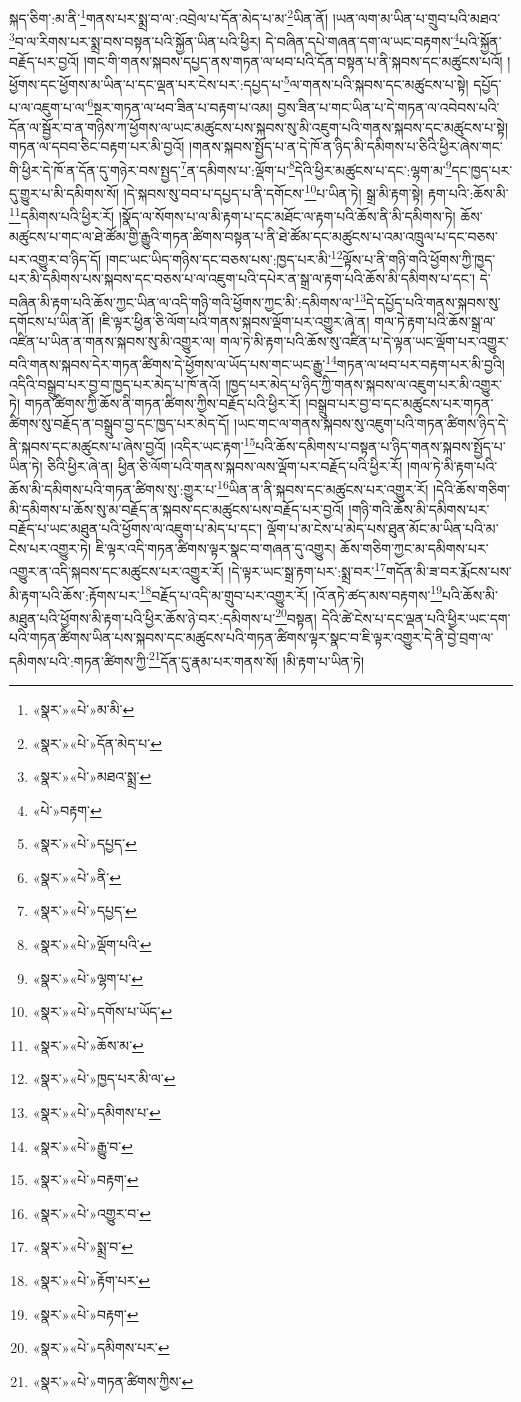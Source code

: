 སྐད་ཅིག་:མ་ནི་\footnote{«སྣར་»«པེ་»མ་མི་}གནས་པར་སྨྲ་བ་ལ་:འབྲེལ་པ་དོན་མེད་པ་མ་\footnote{«སྣར་»«པེ་»དོན་མེད་པ་}ཡིན་ནོ། །ཡན་ལག་མ་ཡིན་པ་གྲུབ་པའི་མཐའ་\footnote{«སྣར་»«པེ་»མཐའ་སྨྲ་}བ་ལ་རིགས་པར་སྨྲ་བས་བསྟན་པའི་སྐྱོན་ཡིན་པའི་ཕྱིར། དེ་བཞིན་དཔེ་གཞན་དག་ལ་ཡང་བརྟགས་\footnote{«པེ་»བརྟག་}པའི་སྐྱོན་བརྗོད་པར་བྱའོ། །གང་གི་གནས་སྐབས་དཔྱད་ནས་གཏན་ལ་ཕབ་པའི་དོན་བསྟན་པ་ནི་སྐབས་དང་མཚུངས་པའོ། །ཕྱོགས་དང་ཕྱོགས་མ་ཡིན་པ་དང་ལྡན་པར་ངེས་པར་:དཔྱད་པ་\footnote{«སྣར་»«པེ་»དཔྱད་}ལ་གནས་པའི་སྐབས་དང་མཚུངས་པ་སྟེ། དཔྱོད་པ་ལ་འཇུག་པ་ལ་\footnote{«སྣར་»«པེ་»ནི་}སྔར་གཏན་ལ་ཕབ་ཟིན་པ་བརྟག་པ་འམ། བྱས་ཟིན་པ་གང་ཡིན་པ་དེ་གཏན་ལ་འབེབས་པའི་དོན་ལ་སྦྱོར་བ་ན་གཉིས་ཀ་ཕྱོགས་ལ་ཡང་མཚུངས་པས་སྐབས་སུ་མི་འཇུག་པའི་གནས་སྐབས་དང་མཚུངས་པ་སྟེ། གཏན་ལ་དབབ་ཅིང་བརྟག་པར་མི་བྱའོ། །གནས་སྐབས་སྤྱོད་པ་ན་དེ་ཁོ་ན་ཉིད་མི་དམིགས་པ་ཅིའི་ཕྱིར་ཞེས་གང་གི་ཕྱིར་དེ་ཁོ་ན་དོན་དུ་གཉེར་བས་སྤྱད་\footnote{«སྣར་»«པེ་»དཔྱད་}ན་དམིགས་པ་:ལྡོག་པ་\footnote{«སྣར་»«པེ་»ལྡོག་པའི་}དེའི་ཕྱིར་མཚུངས་པ་དང་:ལྷག་མ་\footnote{«སྣར་»«པེ་»ལྷག་པ་}དང་ཁྱད་པར་དུ་གྱུར་པ་མི་དམིགས་སོ། །དེ་སྐབས་སུ་བབ་པ་དཔྱད་པ་ནི་དགོངས་\footnote{«སྣར་»«པེ་»དགོས་པ་ཡོད་}པ་ཡིན་ཏེ། སྒྲ་མི་རྟག་སྟེ། རྟག་པའི་:ཆོས་མི་\footnote{«སྣར་»«པེ་»ཆོས་མ་}དམིགས་པའི་ཕྱིར་རོ། །སྣོད་ལ་སོགས་པ་ལ་མི་རྟག་པ་དང་མཐོང་ལ་རྟག་པའི་ཆོས་ནི་མི་དམིགས་ཏེ། ཆོས་མཚུངས་པ་གང་ལ་ཐེ་ཚོམ་གྱི་རྒྱུའི་གཏན་ཚིགས་བསྟན་པ་ནི་ཐེ་ཚོམ་དང་མཚུངས་པ་འམ་འཁྲུལ་པ་དང་བཅས་པར་འགྱུར་བ་ཉིད་དོ། །གང་ཡང་ཡིད་གཉིས་དང་བཅས་པས་:ཁྱད་པར་མི་\footnote{«སྣར་»«པེ་»ཁྱད་པར་མི་ལ་}ལྟོས་པ་ནི་གཉི་གའི་ཕྱོགས་ཀྱི་ཁྱད་པར་མི་དམིགས་པས་སྐབས་དང་བཅས་པ་ལ་འཇུག་པའི་དཔེར་ན་སྒྲ་ལ་རྟག་པའི་ཆོས་མི་དམིགས་པ་དང་། དེ་བཞིན་མི་རྟག་པའི་ཆོས་ཀྱང་ཡིན་ལ་འདི་གཉི་གའི་ཕྱོགས་ཀྱང་མི་:དམིགས་ལ་\footnote{«སྣར་»«པེ་»དམིགས་པ་}དེ་དཔྱོད་པའི་གནས་སྐབས་སུ་དགོངས་པ་ཡིན་ནོ། །ཇི་ལྟར་ཕྱིན་ཅི་ལོག་པའི་གནས་སྐབས་ལྡོག་པར་འགྱུར་ཞེ་ན། གལ་ཏེ་རྟག་པའི་ཆོས་སྒྲ་ལ་འཛིན་པ་ཡིན་ན་གནས་སྐབས་སུ་མི་འགྱུར་ལ། གལ་ཏེ་མི་རྟག་པའི་ཆོས་སུ་འཛིན་པ་དེ་ལྟན་ཡང་ལྡོག་པར་འགྱུར་བའི་གནས་སྐབས་དེར་གཏན་ཚིགས་དེ་ཕྱོགས་ལ་ཡོད་པས་གང་ཡང་རྒྱུ་\footnote{«སྣར་»«པེ་»རྒྱུ་བ་}གཏན་ལ་ཕབ་པར་བརྟག་པར་མི་བྱའི། འདིའི་བསྒྲུབ་པར་བྱ་བ་ཁྱད་པར་མེད་པ་ཁོ་ནའོ། །ཁྱད་པར་མེད་པ་ཉིད་ཀྱི་གནས་སྐབས་ལ་འཇུག་པར་མི་འགྱུར་ཏེ། གཏན་ཚིགས་ཀྱི་ཆོས་ནི་གཏན་ཚིགས་ཀྱིས་བརྗོད་པའི་ཕྱིར་རོ། །བསྒྲུབ་པར་བྱ་བ་དང་མཚུངས་པར་གཏན་ཚིགས་སུ་བརྗོད་ན་བསྒྲུབ་བྱ་དང་ཁྱད་པར་མེད་དོ། །ཡང་གང་ལ་གནས་སྐབས་སུ་འཇུག་པའི་གཏན་ཚིགས་ཉིད་དེ་ནི་སྐབས་དང་མཚུངས་པ་ཞེས་བྱའོ། །འདིར་ཡང་རྟག་\footnote{«སྣར་»«པེ་»བརྟག་}པའི་ཆོས་དམིགས་པ་བསྟན་པ་ཉིད་གནས་སྐབས་སྤྱོད་པ་ཡིན་ཏེ། ཅིའི་ཕྱིར་ཞེ་ན། ཕྱིན་ཅི་ལོག་པའི་གནས་སྐབས་ལས་ལྡོག་པར་བརྗོད་པའི་ཕྱིར་རོ། །གལ་ཏེ་མི་རྟག་པའི་ཆོས་མི་དམིགས་པའི་གཏན་ཚིགས་སུ་:གྱུར་པ་\footnote{«སྣར་»«པེ་»འགྱུར་བ་}ཡིན་ན་ནི་སྐབས་དང་མཚུངས་པར་འགྱུར་རོ། །དེའི་ཆོས་གཅིག་མི་དམིགས་པ་ཆོས་སུ་མ་བརྗོད་ན་སྐབས་དང་མཚུངས་པས་བརྗོད་པར་བྱའོ། །གཉི་གའི་ཆོས་མི་དམིགས་པར་བརྗོད་པ་ཡང་མཐུན་པའི་ཕྱོགས་ལ་འཇུག་པ་མེད་པ་དང་། ལྡོག་པ་མ་ངེས་པ་མེད་པས་ཐུན་མོང་མ་ཡིན་པའི་མ་ངེས་པར་འགྱུར་ཏེ། ཇི་ལྟར་འདི་གཏན་ཚིགས་ལྟར་སྣང་བ་གཞན་དུ་འགྱུར། ཆོས་གཅིག་ཀྱང་མ་དམིགས་པར་འགྱུར་ན་འདི་སྐབས་དང་མཚུངས་པར་འགྱུར་རོ། །དེ་ལྟར་ཡང་སྒྲ་རྟག་པར་:སྨྲ་བར་\footnote{«སྣར་»«པེ་»སྨྲ་བ་}གདོན་མི་ཟ་བར་རྨོངས་པས་མི་རྟག་པའི་ཆོས་:རྟོགས་པར་\footnote{«སྣར་»«པེ་»རྟོག་པར་}བརྗོད་པ་འདི་མ་གྲུབ་པར་འགྱུར་རོ། །འོ་ནཏེ་ཚད་མས་བརྟགས་\footnote{«སྣར་»«པེ་»བརྟག་}པའི་ཆོས་མི་མཐུན་པའི་ཕྱོགས་མི་རྟག་པའི་ཕྱིར་ཆོས་ཉེ་བར་:དམིགས་པ་\footnote{«སྣར་»«པེ་»དམིགས་པར་}བསྟན། དེའི་ཚེ་ངེས་པ་དང་ལྡན་པའི་ཕྱིར་ཡང་དག་པའི་གཏན་ཚིགས་ཡིན་པས་སྐབས་དང་མཚུངས་པའི་གཏན་ཚིགས་ལྟར་སྣང་བ་ཇི་ལྟར་འགྱུར་དེ་ནི་བྱེ་བྲག་ལ་དམིགས་པའི་:གཏན་ཚིགས་ཀྱི་\footnote{«སྣར་»«པེ་»གཏན་ཚིགས་ཀྱིས་}དོན་དུ་རྣམ་པར་གནས་སོ། །མི་རྟག་པ་ཡིན་ཏེ། 